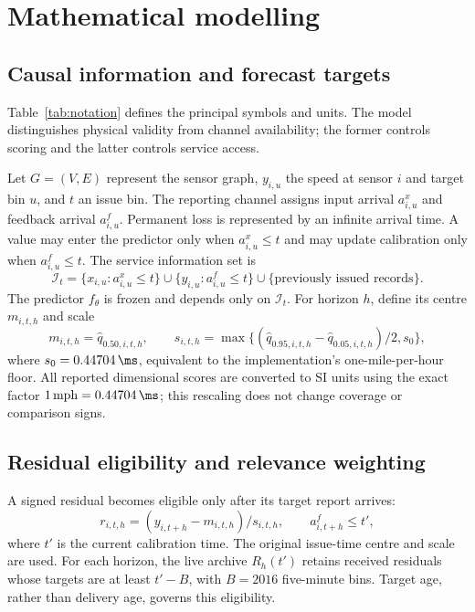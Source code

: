 \section{Mathematical modelling}\label{sec:math}
\subsection{Causal information and forecast targets}
Table~\ref{tab:notation} defines the principal symbols and units. The model distinguishes physical validity from channel availability; the former controls scoring and the latter controls service access.

Let $G=(V,E)$ represent the sensor graph, $y_{i,u}$ the speed at sensor $i$ and target bin $u$, and $t$ an issue bin. The reporting channel assigns input arrival $a^x_{i,u}$ and feedback arrival $a^f_{i,u}$. Permanent loss is represented by an infinite arrival time. A value may enter the predictor only when $a^x_{i,u}\le t$ and may update calibration only when $a^f_{i,u}\le t$. The service information set is
\begin{equation}
\mathcal I_t=\{x_{i,u}:a^x_{i,u}\le t\}\cup\{y_{i,u}:a^f_{i,u}\le t\}\cup\{\text{previously issued records}\}.
\end{equation}
\label{eq:information}
The predictor $f_\theta$ is frozen and depends only on $\mathcal I_t$. For horizon $h$, define its centre $m_{i,t,h}$ and scale
\begin{equation}
m_{i,t,h}=\widehat q_{0.50,i,t,h},\qquad
s_{i,t,h}=\max\{(\widehat q_{0.95,i,t,h}-\widehat q_{0.05,i,t,h})/2,s_0\},
\label{eq:scale}
\end{equation}
where $s_0=0.44704\,\ms$, equivalent to the implementation's one-mile-per-hour floor. All reported dimensional scores are converted to SI units using the exact factor $1\,\mathrm{mph}=0.44704\,\ms$; this rescaling does not change coverage or comparison signs.

\subsection{Residual eligibility and relevance weighting}
A signed residual becomes eligible only after its target report arrives:
\begin{equation}
r_{i,t,h}=(y_{i,t+h}-m_{i,t,h})/s_{i,t,h},\qquad a^f_{i,t+h}\le t',
\end{equation}
where $t'$ is the current calibration time. The original issue-time centre and scale are used. For each horizon, the live archive $R_h(t')$ retains received residuals whose targets are at least $t'-B$, with $B=2016$ five-minute bins. Target age, rather than delivery age, governs this eligibility.

